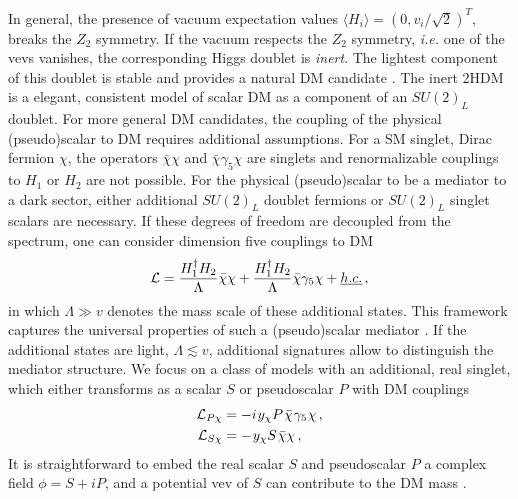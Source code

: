 In general, the presence of vacuum expectation values $\langle H_i\rangle=(0,v_i/\sqrt{2})^T$, breaks the $Z_2$ symmetry. If the vacuum respects the $Z_2$ symmetry, \emph{i.e.} one of the vevs vanishes, the corresponding Higgs doublet is \emph{inert}. The lightest component of this doublet is stable and provides a natural DM candidate \cite{}. The inert 2HDM is a elegant, consistent model of scalar DM as a component of an $SU(2)_L$ doublet. For more general DM candidates, the coupling of the physical (pseudo)scalar to DM requires additional assumptions. For a SM singlet, Dirac fermion $\chi$, the operators $\bar \chi \chi$ and $\bar \chi \gamma_5\chi$ are singlets and renormalizable couplings to $H_1$ or $H_2$ are not possible. For the physical (pseudo)scalar to be a mediator to a dark sector, either additional $SU(2)_L$ doublet fermions or $SU(2)_L$ singlet scalars are necessary. If these degrees of freedom are decoupled from the spectrum, one can consider dimension five couplings to DM
\begin{align}
\mathcal{L}=\frac{H_1^\dagger H_2}{\Lambda} \bar \chi \chi+\frac{H_1^\dagger H_2}{\Lambda} \bar \chi \gamma_5 \chi + \emph{h.c.}\,,
\end{align}
in which $\Lambda \gg v$ denotes the mass scale of these additional states. This framework captures the universal properties of such a (pseudo)scalar mediator \cite{}. If the additional states are light, $\Lambda \lesssim v$, additional signatures allow to distinguish the mediator structure. We focus on a class of models with an additional, real singlet, which either transforms as a scalar $S$ or pseudoscalar $P$ with DM couplings
%
\begin{align} \label{eq:Lx}
{\cal L}_{P\chi} &= - i \hspace{0.25mm} y_\chi P \hspace{0.25mm} \bar \chi \hspace{0.25mm} \gamma_5 \hspace{0.1mm} \chi \,,\\
{\cal L}_{S\chi} &= -  \hspace{0.25mm} y_\chi S \hspace{0.25mm} \bar \chi   \chi \,,
\end{align}
%
It is straightforward to embed the real scalar $S$ and pseudoscalar $P$  a complex field $\phi = S+i P$, and a potential vev of $S$ can contribute to the DM mass \cite{}. \\

